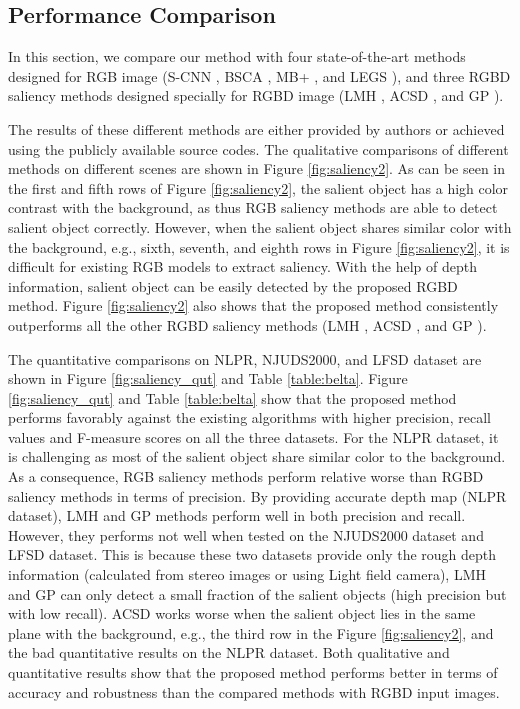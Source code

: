 \documentclass[journal]{IEEEtran}
\begin{document}
\subsection{Performance Comparison}
In this section, we compare our method with four state-of-the-art methods designed for RGB image (S-CNN \cite{he2015supercnn},  BSCA \cite{qin2015saliency}, MB+ \cite{zhang2015MBD}, and LEGS \cite{wang2015deep}), and three RGBD saliency methods designed specially for RGBD image (LMH \cite{peng2014rgbd}, ACSD \cite{ju2014depth}, and GP \cite{ren2015exploiting}).

The results of these different methods are either provided by authors or achieved using the publicly available source codes. The qualitative comparisons of different methods on different scenes are shown in Figure \ref{fig:saliency2}. As can be seen in the first and fifth rows of Figure \ref{fig:saliency2}, the salient object has a high color contrast with the background, as thus RGB saliency methods are able to detect salient object correctly. However, when the salient object shares similar color with the background, e.g., sixth, seventh, and eighth rows in Figure \ref{fig:saliency2}, it is difficult for existing RGB models to extract saliency. With the help of depth information, salient object can be easily detected by the proposed RGBD method. Figure \ref{fig:saliency2} also shows that the proposed method consistently outperforms all the other RGBD saliency methods (LMH \cite{peng2014rgbd}, ACSD \cite{ju2014depth}, and GP \cite{ren2015exploiting}).

The quantitative comparisons on NLPR, NJUDS2000, and LFSD dataset are shown in Figure \ref{fig:saliency_qut} and Table \ref{table:belta}.
Figure \ref{fig:saliency_qut} and Table \ref{table:belta} show that the proposed method performs favorably against the existing algorithms with higher
precision, recall values and F-measure scores on all the three datasets. For the NLPR dataset, it is challenging as most of the salient object share similar color to the background. As a consequence, RGB saliency methods perform relative worse than RGBD saliency methods in terms of precision. By providing accurate depth map (NLPR dataset), LMH \cite{peng2014rgbd} and GP \cite{ren2015exploiting} methods perform well in both precision and recall. However, they performs not well when tested on the NJUDS2000 dataset and LFSD dataset. This is because these two datasets provide only the rough depth information (calculated from stereo images or using Light field camera), LMH \cite{peng2014rgbd} and GP \cite{ren2015exploiting} can only detect a small fraction of the salient objects (high precision but with low recall). ACSD \cite{ju2014depth} works worse when the salient object lies in the same plane with the background, e.g., the third row in the Figure \ref{fig:saliency2}, and the bad quantitative results on the NLPR dataset. Both qualitative and quantitative results show that the proposed method performs better in terms of accuracy and robustness than the compared methods with RGBD input images.
\end{document}
